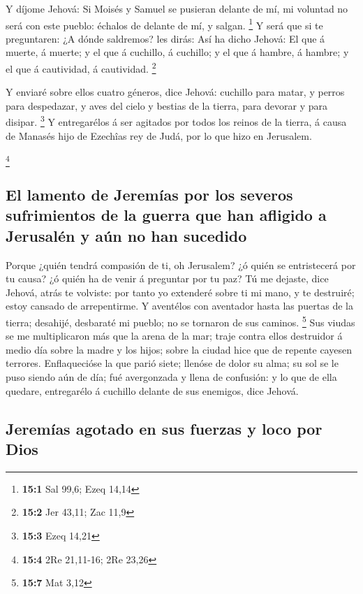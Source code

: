  Y díjome Jehová: Si Moisés y Samuel se pusieran delante
de mí, mi voluntad no será con este pueblo: échalos de delante de mí, y
salgan. \footnote{\textbf{15:1} Sal 99,6; Ezeq 14,14}  Y
será que si te preguntaren: ¿A dónde saldremos? les dirás: Así ha dicho
Jehová: El que á muerte, á muerte; y el que á cuchillo, á cuchillo; y el
que á hambre, á hambre; y el que á cautividad, á cautividad. \footnote{\textbf{15:2}
  Jer 43,11; Zac 11,9}

 Y enviaré sobre ellos cuatro géneros, dice Jehová:
cuchillo para matar, y perros para despedazar, y aves del cielo y
bestias de la tierra, para devorar y para disipar. \footnote{\textbf{15:3}
  Ezeq 14,21}  Y entregarélos á ser agitados por todos los
reinos de la tierra, á causa de Manasés hijo de Ezechîas rey de Judá,
por lo que hizo en Jerusalem.

\footnote{\textbf{15:4} 2Re 21,11-16; 2Re 23,26}

\hypertarget{el-lamento-de-jeremuxedas-por-los-severos-sufrimientos-de-la-guerra-que-han-afligido-a-jerusaluxe9n-y-auxfan-no-han-sucedido}{%
\subsection{El lamento de Jeremías por los severos sufrimientos de la
guerra que han afligido a Jerusalén y aún no han
sucedido}\label{el-lamento-de-jeremuxedas-por-los-severos-sufrimientos-de-la-guerra-que-han-afligido-a-jerusaluxe9n-y-auxfan-no-han-sucedido}}

 Porque ¿quién tendrá compasión de ti, oh Jerusalem? ¿ó
quién se entristecerá por tu causa? ¿ó quién ha de venir á preguntar por
tu paz?  Tú me dejaste, dice Jehová, atrás te volviste:
por tanto yo extenderé sobre ti mi mano, y te destruiré; estoy cansado
de arrepentirme.  Y aventélos con aventador hasta las
puertas de la tierra; desahijé, desbaraté mi pueblo; no se tornaron de
sus caminos. \footnote{\textbf{15:7} Mat 3,12}  Sus viudas
se me multiplicaron más que la arena de la mar; traje contra ellos
destruidor á medio día sobre la madre y los hijos; sobre la ciudad hice
que de repente cayesen terrores.  Enflaquecióse la que
parió siete; llenóse de dolor su alma; su sol se le puso siendo aún de
día; fué avergonzada y llena de confusión: y lo que de ella quedare,
entregarélo á cuchillo delante de sus enemigos, dice Jehová.

\hypertarget{jeremuxedas-agotado-en-sus-fuerzas-y-loco-por-dios}{%
\subsection{Jeremías agotado en sus fuerzas y loco por
Dios}\label{jeremuxedas-agotado-en-sus-fuerzas-y-loco-por-dios}}

